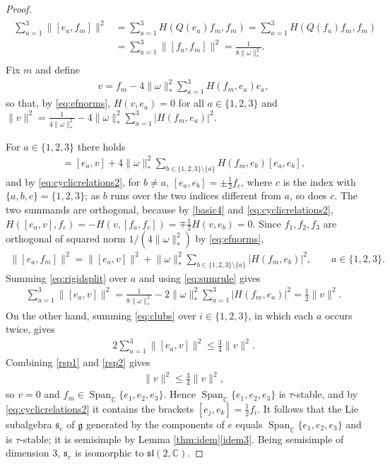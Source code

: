 \documentclass[leqno,10pt]{amsart}
\theoremstyle{definition}
\numberwithin{equation}{section}
\newcommand{\om}{\omega}
\newcommand{\spn}{\operatorname{Span}}
\newcommand{\sll}{\mathfrak{sl}}
\newcommand{\g}{\mathfrak{g}}
\newcommand{\com}{\mathbb C}
\newcommand{\norm}[1]{\lVert #1\rVert}
\newcommand{\comass}[1]{\lVert #1\rVert_{\ast}}%
\newcommand{\subs}{\mathfrak{s}}
\newcommand{\qad}{Q}
\begin{document}
\begin{proof}
\begin{align}
\begin{aligned}
\sum_{a=1}^3\norm{[e_a,f_m]}^2&=\sum_{a=1}^3H(\qad(e_{a})f_{m}, f_{m}) = \sum_{a=1}^3H(\qad(f_{a})f_{m}, f_{m})\\
&= \sum_{a=1}^3\norm{[f_a,f_m]}^2= \frac{1}{8\comass{\om}^{2}}.
\end{aligned}
\end{align}
Fix $m$ and define
\begin{align}
v = f_{m} - 4\comass{\om}^{2}\sum_{a = 1}^{3}H(f_{m}, e_{a})e_{a},
\end{align}
so that, by \eqref{eq:efnorms}, $H(v, e_{a}) = 0$ for all $a \in \{1, 2, 3\}$ and $\norm{v}^{2} = \frac{1}{4\comass{\om}^{2}} - 4\comass{\om}^{2}\sum_{a=1}^{3}|H(f_{m}, e_{a})|^{2}$.

For $a \in \{1, 2, 3\}$ there holds
\begin{align}
[e_{a}, f_{m}] = [e_{a}, v] + 4\comass{\om}^{2}\sum_{b \in \{1, 2, 3\}\setminus\{a\}}H(f_{m}, e_{b})[e_{a}, e_{b}],
\end{align}
and by \eqref{eq:cyclicrelations2}, for $b \neq a$, $[e_{a}, e_{b}] = \pm \tfrac{1}{2}f_{c}$, where $c$ is the index with $\{a, b, c\} = \{1, 2, 3\}$; as $b$ runs over the two indices different from $a$, so does $c$. The two summands are orthogonal, because by \eqref{basic4} and \eqref{eq:cyclicrelations2}, $H([e_{a}, v], f_{c}) = -H(v, [f_{a}, f_{c}]) = \mp \tfrac{1}{2}H(v, e_{b}) = 0$. Since $f_{1}, f_{2}, f_{3}$ are orthogonal of squared norm $1/(4\comass{\om}^{2})$ by \eqref{eq:efnorms},
\begin{align}\label{eq:rigidsplit}
\norm{[e_{a}, f_{m}]}^{2} = \norm{[e_{a}, v]}^{2} + \comass{\om}^{2}\sum_{b \in \{1, 2, 3\}\setminus\{a\}}|H(f_{m}, e_{b})|^{2}, \qquad a \in \{1, 2, 3\}.
\end{align}
Summing \eqref{eq:rigidsplit} over $a$ and using \eqref{eq:sumrule} gives
\begin{align}\label{rsp1}
\sum_{a=1}^{3}\norm{[e_{a}, v]}^{2} = \frac{1}{8\comass{\om}^{2}} - 2\comass{\om}^{2}\sum_{a = 1}^{3}|H(f_{m}, e_{a})|^2 = \tfrac{1}{2}\norm{v}^{2}.
\end{align}
On the other hand, summing \eqref{eq:clubs} over $i \in \{1, 2, 3\}$, in which each $a$ occurs twice, gives
\begin{align}\label{rsp2}
2\sum_{a=1}^{3}\norm{[e_{a}, v]}^{2} \leq \tfrac{3}{4}\norm{v}^{2}.
\end{align}
Combining \eqref{rsp1} and \eqref{rsp2} gives
\begin{align}
\norm{v}^{2} \leq \tfrac{3}{4}\norm{v}^{2},
\end{align}
so $v = 0$ and $f_{m} \in \spn_{\com}\{e_{1}, e_{2}, e_{3}\}$. Hence $\spn_{\com}\{e_{1}, e_{2}, e_{3}\}$ is $\tau$-stable, and by \eqref{eq:cyclicrelations2} it contains the brackets $[e_{j}, e_{k}] = \tfrac{1}{2}f_{i}$. It follows that the Lie subalgebra $\subs_{e}$ of $\g$ generated by the components of $e$ equals $\spn_{\com}\{e_{1}, e_{2}, e_{3}\}$ and is $\tau$-stable; it is semisimple by Lemma \ref{thm:idem}\ref{idem3}. Being semisimple of dimension $3$, $\subs_{e}$ is isomorphic to $\sll(2, \com)$.
\end{proof}
\end{document}
